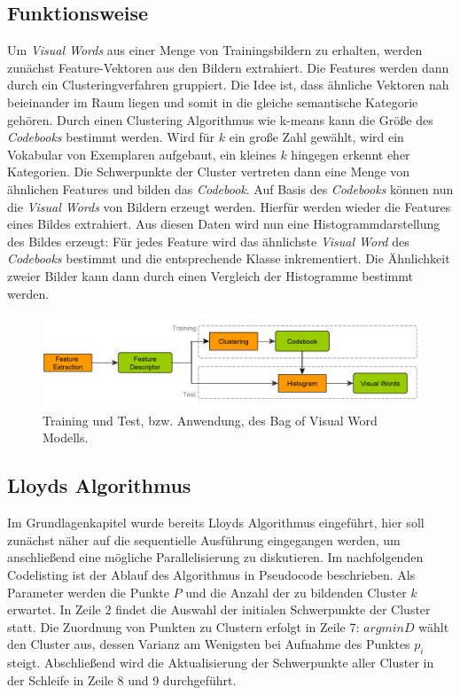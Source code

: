 \subsection{Funktionsweise}
Um \textit{Visual Words} aus einer Menge von Trainingsbildern zu erhalten, werden zunächst Feature-Vektoren aus den Bildern extrahiert. Die Features werden dann durch ein Clusteringverfahren gruppiert. Die Idee ist, dass ähnliche Vektoren nah beieinander im Raum liegen und somit in die gleiche semantische Kategorie gehören. Durch einen Clustering Algorithmus wie k-means kann die Größe des \textit{Codebooks} bestimmt werden. Wird für $k$ ein große Zahl gewählt, wird ein Vokabular von Exemplaren aufgebaut, ein kleines $k$ hingegen erkennt eher Kategorien. Die Schwerpunkte der Cluster vertreten dann eine Menge von ähnlichen Features und bilden das \textit{Codebook}.
Auf Basis des \textit{Codebooks} können nun die \textit{Visual Words} von Bildern erzeugt werden. Hierfür werden wieder die Features eines Bildes extrahiert. Aus diesen Daten wird nun eine Histogrammdarstellung des Bildes erzeugt: Für jedes Feature wird das ähnlichste \textit{Visual Word} des \textit{Codebooks} bestimmt und die entsprechende Klasse inkrementiert. Die Ähnlichkeit zweier Bilder kann dann durch einen Vergleich der Histogramme bestimmt werden.

\begin{figure}
	\centering
	\includegraphics[scale=0.65]{images/bovw_process.pdf}
	\caption{Training und Test, bzw. Anwendung, des Bag of Visual Word Modells. }
	\label{img:bovw}
\end{figure}

\subsection{Lloyds Algorithmus}

Im Grundlagenkapitel wurde bereits Lloyds Algorithmus eingeführt, hier soll zunächst näher auf die sequentielle Ausführung eingegangen werden, um anschließend eine mögliche Parallelisierung zu diskutieren. Im nachfolgenden Codelisting ist der Ablauf des Algorithmus in Pseudocode beschrieben. Als Parameter werden die Punkte $P$ und die Anzahl der zu bildenden Cluster $k$ erwartet. In Zeile 2 findet die Auswahl der initialen Schwerpunkte der Cluster statt. Die Zuordnung von Punkten zu Clustern erfolgt in Zeile 7: $argminD$ wählt den Cluster aus, dessen Varianz am Wenigsten bei Aufnahme des Punktes $p_{i}$ steigt. Abschließend wird die Aktualisierung der Schwerpunkte aller Cluster in der Schleife in Zeile 8 und 9 durchgeführt.


